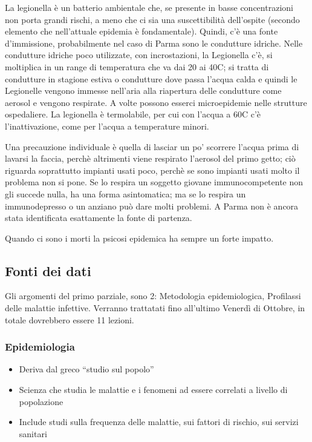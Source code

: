 La legionella è un batterio ambientale che, se presente in basse
concentrazioni non porta grandi rischi, a meno che ci sia una
suscettibilità dell'ospite (secondo elemento che nell'attuale epidemia è
fondamentale). Quindi, c'è una fonte d'immissione, probabilmente nel
caso di Parma sono le condutture idriche. Nelle condutture idriche poco
utilizzate, con incrostazioni, la Legionella c'è, si moltiplica in un
range di temperatura che va dai 20 ai 40C; si tratta di condutture in
stagione estiva o condutture dove passa l'acqua calda e quindi le
Legionelle vengono immesse nell'aria alla riapertura delle condutture
come aerosol e vengono respirate. A volte possono esserci microepidemie
nelle strutture ospedaliere. La legionella è termolabile, per cui con
l'acqua a 60C c'è l'inattivazione, come per l'acqua a temperature
minori.

Una precauzione individuale è quella di lasciar un po' scorrere l'acqua
prima di lavarsi la faccia, perchè altrimenti viene respirato l'aerosol
del primo getto; ciò riguarda soprattutto impianti usati poco, perchè se
sono impianti usati molto il problema non si pone. Se lo respira un
soggetto giovane immunocompetente non gli succede nulla, ha una forma
asintomatica; ma se lo respira un immunodepresso o un anziano può dare
molti problemi. A Parma non è ancora stata identificata esattamente la
fonte di partenza.

Quando ci sono i morti la psicosi epidemica ha sempre un forte impatto.

\subsection{Fonti dei dati}


Gli argomenti del primo parziale, sono 2: Metodologia epidemiologica,
Profilassi delle malattie infettive. Verranno trattatati fino all'ultimo
Venerdì di Ottobre, in totale dovrebbero essere 11 lezioni.

\subsubsection{Epidemiologia}


\begin{itemize}
\item
  Deriva dal greco ``studio sul popolo''
\item
  Scienza che studia le malattie e i fenomeni ad essere correlati a
  livello di popolazione
\item
  Include studi sulla frequenza delle malattie, sui fattori di rischio,
  sui servizi sanitari
\end{itemize}

